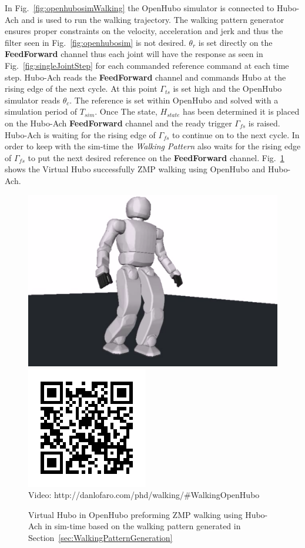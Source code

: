 

In Fig.~\ref{fig:openhubosimWalking} the OpenHubo simulator is connected to Hubo-Ach and is used to run the walking trajectory.  
The walking pattern generator ensures proper constraints on the velocity, acceleration and jerk and thus the filter seen in Fig.~\ref{fig:openhubosim} is not desired.  
$\theta_r$ is set directly on the \textbf{FeedForward} channel thus each joint will have the response as seen in Fig.~\ref{fig:singleJointStep} for each commanded reference command at each time step.
Hubo-Ach reads the \textbf{FeedForward} channel and commands Hubo at the rising edge of the next cycle.  
At this point $\Gamma_{ts}$ is set high and the OpenHubo simulator reads $\theta_c$.  
The reference is set within OpenHubo and solved with a simulation period of $T_{sim}$.  
Once The state, $H_{state}$ has been determined it is placed on the Hubo-Ach \textbf{FeedForward} channel and the ready trigger $\Gamma_{fs}$ is raised.  
Hubo-Ach is waiting for the rising edge of $\Gamma_{fs}$ to continue on to the next cycle.  
In order to keep with the sim-time the \textit{Walking Pattern} also waits for the rising edge of $\Gamma_{fs}$ to put the next desired reference on the \textbf{FeedForward} channel.
Fig.~\ref{fig:openHuboWalkingVideo} shows the Virtual Hubo successfully ZMP walking using OpenHubo and Hubo-Ach.

\begin{figure}[thpb]
  \centering
\includegraphics[width=0.6\columnwidth]{./examples/pix/openhubo-walking.png}
\includegraphics[width=0.3\columnwidth]{./qrcode/qrcode-openhubo-walking.png}\\
      Video: http://danlofaro.com/phd/walking/\#WalkingOpenHubo
  \caption{Virtual Hubo in OpenHubo preforming ZMP walking using Hubo-Ach in sim-time based on the walking pattern generated in Section~\ref{sec:WalkingPatternGeneration}}
  \label{fig:openHuboWalkingVideo}
\end{figure}




